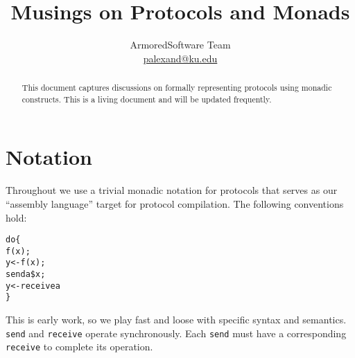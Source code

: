 \documentclass[10pt]{article}
\title{Musings on Protocols and Monads}
\author{ArmoredSoftware Team \\
 \url{palexand@ku.edu}}
\begin{document}
\maketitle

\begin{abstract}
  This document captures discussions on formally representing
  protocols using monadic constructs.  This is a living document and
  will be updated frequently.
\end{abstract}

\section*{Notation}

Throughout we use a trivial monadic notation for protocols that serves
as our ``assembly language'' target for protocol compilation.
The following conventions hold:

\begin{alltt}
  do \{                % evaluate functions in sequence
       f(x);          % calculate f(x) and discard the result
       y <- f(x);     % calculate f(x) and bind the result to y
       send a \$ x;    % evaluate x and send the result to a
       y <- receive a % receive data from a and the result to y
  \}
\end{alltt}

This is early work, so we play fast and loose with specific syntax and
semantics.  \Verb+send+ and \Verb+receive+ operate synchronously.
Each \Verb+send+ must have a corresponding \Verb+receive+ to complete
its operation.


\end{document}
